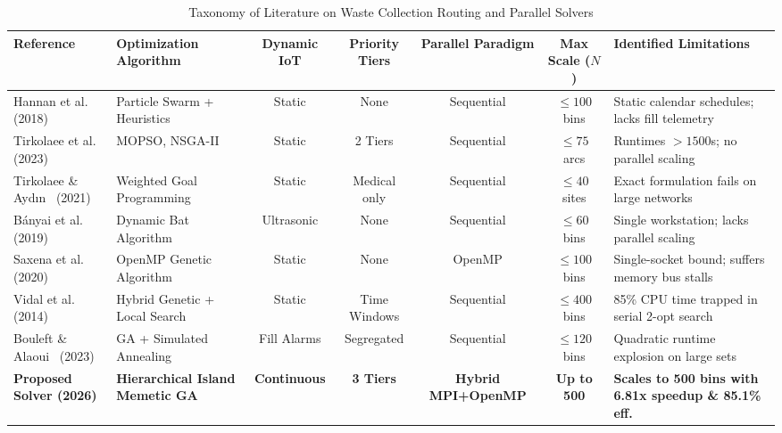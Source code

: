 \documentclass[conference]{IEEEtran}
\begin{document}
\begin{table}[t]
\centering
\caption{Taxonomy of Literature on Waste Collection Routing and Parallel Solvers}
\label{tab:literature}
\setlength{\tabcolsep}{4pt}
\begin{adjustbox}{width=\textwidth,center}
\begin{tabular}{lp{3.2cm}ccccl}
\toprule
\textbf{Reference} & \textbf{Optimization Algorithm} & \textbf{Dynamic IoT} & \textbf{Priority Tiers} & \textbf{Parallel Paradigm} & \textbf{Max Scale ($N$)} & \textbf{Identified Limitations} \\
\midrule
Hannan et al.~\cite{hannan2018capacitated} (2018) & Particle Swarm + Heuristics & Static & None & Sequential & $\le 100$ bins & Static calendar schedules; lacks fill telemetry \\
Tirkolaee et al.~\cite{tirkolaee2023novel} (2023) & MOPSO, NSGA-II & Static & 2 Tiers & Sequential & $\le 75$ arcs & Runtimes $>1500$s; no parallel scaling \\
Tirkolaee \& Ayd{\i}n~\cite{tirkolaee2021sustainable} (2021) & Weighted Goal Programming & Static & Medical only & Sequential & $\le 40$ sites & Exact formulation fails on large networks \\
B{\'a}nyai et al.~\cite{banyai2019optimization} (2019) & Dynamic Bat Algorithm & Ultrasonic & None & Sequential & $\le 60$ bins & Single workstation; lacks parallel scaling \\
Saxena et al.~\cite{saxena2020optimized} (2020) & OpenMP Genetic Algorithm & Static & None & OpenMP & $\le 100$ bins & Single-socket bound; suffers memory bus stalls \\
Vidal et al.~\cite{vidal2014hybrid} (2014) & Hybrid Genetic + Local Search & Static & Time Windows & Sequential & $\le 400$ bins & 85\% CPU time trapped in serial 2-opt search \\
Bouleft \& Alaoui~\cite{bouleft2023dynamic} (2023) & GA + Simulated Annealing & Fill Alarms & Segregated & Sequential & $\le 120$ bins & Quadratic runtime explosion on large sets \\
\midrule
\textbf{Proposed Solver (2026)} & \textbf{Hierarchical Island Memetic GA} & \textbf{Continuous} & \textbf{3 Tiers} & \textbf{Hybrid MPI+OpenMP} & \textbf{Up to 500} & \textbf{Scales to 500 bins with 6.81x speedup \& 85.1\% eff.} \\
\bottomrule
\end{tabular}
\end{adjustbox}
\end{table}
\end{document}
